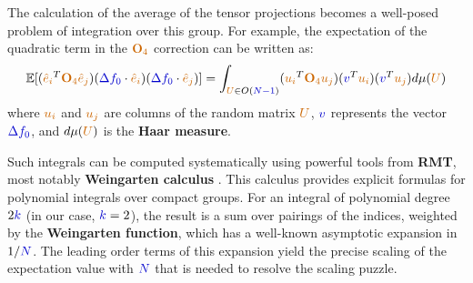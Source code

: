 \documentclass[a4paper]{article}
\theoremstyle{plain}
\theoremstyle{definition}
\theoremstyle{remark}
\begin{document}
\begin{tcolorbox}[colback=yellow!10,colframe=yellow!60!black,title={\textbf{📖 DEFINITION: Tensor Projection Calculation}},enhanced,drop shadow]
The calculation of the average of the tensor projections becomes a well-posed problem of integration over this group. For example, the expectation of the quadratic term in the $\textcolor{orange!80!black}{\mathbf{O}_4}$ correction can be written as:
\begin{equation}
\mathbb{E}[(\textcolor{orange!80!black}{\hat{e}_{i}}^{T}\textcolor{orange!80!black}{\mathbf{O}_{4}}\textcolor{orange!80!black}{\hat{e}_{j}})(\textcolor{blue!80!black}{\Delta f_{0}}\cdot\textcolor{orange!80!black}{\hat{e}_{i}})(\textcolor{blue!80!black}{\Delta f_{0}}\cdot\textcolor{orange!80!black}{\hat{e}_{j}})] = \int_{\textcolor{orange!80!black}{U} \in O(\textcolor{blue!80!black}{N-1})} (\textcolor{orange!80!black}{u_i}^T \textcolor{orange!80!black}{\mathbf{O}_4} \textcolor{orange!80!black}{u_j}) (\textcolor{blue!80!black}{v}^T \textcolor{orange!80!black}{u_i}) (\textcolor{blue!80!black}{v}^T \textcolor{orange!80!black}{u_j}) d\mu(\textcolor{orange!80!black}{U})
\end{equation}
where $\textcolor{orange!80!black}{u_i}$ and $\textcolor{orange!80!black}{u_j}$ are columns of the random matrix $\textcolor{orange!80!black}{U}$, $\textcolor{blue!80!black}{v}$ represents the vector $\textcolor{blue!80!black}{\Delta f_0}$, and $d\mu(\textcolor{orange!80!black}{U})$ is the \textcolor{purple!80!black}{\textbf{Haar measure}}.
\end{tcolorbox}

\begin{tcolorbox}[colback=blue!10,colframe=blue!60!black,title={\textbf{🎯 THEOREM: Weingarten Calculus}},enhanced,drop shadow]
Such integrals can be computed systematically using powerful tools from \textcolor{purple!80!black}{\textbf{RMT}}, most notably \textcolor{orange!80!black}{\textbf{Weingarten calculus}} \cite{collins2022weingarten}. This calculus provides explicit formulas for polynomial integrals over compact groups. For an integral of polynomial degree $2\textcolor{blue!80!black}{k}$ (in our case, $\textcolor{blue!80!black}{k}=2$), the result is a sum over pairings of the indices, weighted by the \textcolor{orange!80!black}{\textbf{Weingarten function}}, which has a well-known asymptotic expansion in $1/\textcolor{blue!80!black}{N}$. The leading order terms of this expansion yield the precise scaling of the expectation value with $\textcolor{blue!80!black}{N}$ that is needed to resolve the scaling puzzle.
\end{tcolorbox}
\end{document}
